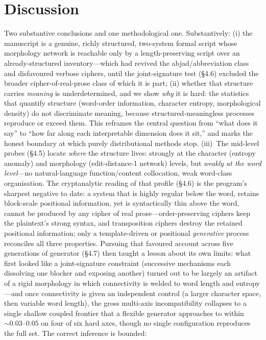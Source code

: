 \documentclass[11pt]{article}
\begin{document}
\section{Discussion}
Two substantive conclusions and one methodological one. Substantively: (i) the
manuscript is a genuine, richly structured, two-system formal script whose morphology
network is reachable only by a length-preserving script over an already-structured
inventory---which had revived the abjad/abbreviation class and disfavoured verbose
ciphers, until the joint-signature test (\S4.6) excluded the broader
cipher-of-real-prose class of which it is part; (ii) whether that structure carries
\emph{meaning} is underdetermined, and we show \emph{why} it is hard: the statistics
that quantify structure (word-order information, character entropy, morphological
density) do not discriminate meaning, because structured-meaningless processes reproduce
or exceed them. This reframes the central question from ``what does it say'' to ``how far
along each interpretable dimension does it sit,'' and marks the honest boundary at which
purely distributional methods stop. (iii)~The mid-level probes (\S4.5) locate
\emph{where} the structure lives: strongly at the character (entropy anomaly) and
morphology (edit-distance-1 network) levels, but \emph{weakly at the word level}---no
natural-language function/content collocation, weak word-class organisation. The
cryptanalytic reading of that profile (\S4.6) is the program's sharpest negative to
date: a system that is highly regular below the word, retains block-scale positional
information, yet is syntactically thin above the word, cannot be produced by any cipher
of real prose---order-preserving ciphers keep the plaintext's strong syntax, and
transposition ciphers destroy the retained positional information; only a template-driven
or positional \emph{generative} process reconciles all three properties. Pursuing that
favoured account across five generations of generator (\S4.7) then taught a lesson about
its own limits: what first looked like a joint-signature constraint (successive mechanisms
each dissolving one blocker and exposing another) turned out to be largely an artifact of a
rigid morphology in which connectivity is welded to word length and entropy---and once
connectivity is given an independent control (a larger character space, then variable word
length), the gross multi-axis incompatibility collapses to a single shallow coupled frontier
that a flexible generator approaches to within $\sim\!0.03$--$0.05$ on four of six hard axes,
though no single configuration reproduces the full set. The correct inference is bounded:
\end{document}
